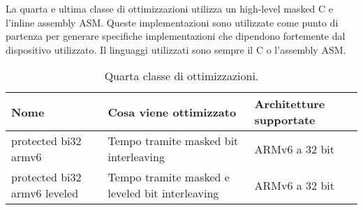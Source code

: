 \noindent La quarta e ultima classe di ottimizzazioni utilizza un high-level masked C e l'inline assembly ASM\cite{github}. Queste implementazioni sono utilizzate come punto di partenza per generare specifiche implementazioni che dipendono fortemente dal dispositivo utilizzato. Il linguaggi utilizzati sono sempre il C o l'assembly ASM.

\begin{table}[H]
    \centering
	\begin{tabular}{|m{}<{\centering}||m{}<{\centering}|m{}<{\centering}|}
		\hline
		\textbf{Nome} & \textbf{Cosa viene ottimizzato} & \textbf{Architetture supportate} \\
        \hline \hline
        protected bi32 armv6 & Tempo tramite masked bit interleaving & ARMv6 a 32 bit \\
        \hline
        protected bi32 armv6 leveled & Tempo tramite masked e leveled bit interleaving & ARMv6 a 32 bit \\
        \hline
    \end{tabular}
    \caption{Quarta classe di ottimizzazioni.}
\end{table}
